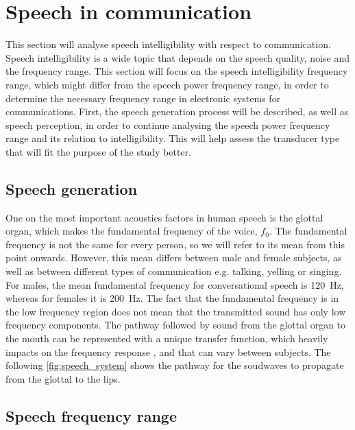 \section{Speech in communication}
\label{speech_in_comm}

This section will analyse speech intelligibility with respect to communication. Speech intelligibility is a wide topic that depends on the speech quality, noise and the frequency range. This section will focus on the speech intelligibility frequency range, which might differ from the speech power frequency range, in order to determine the necessary frequency range in electronic systems for communications. First, the speech generation process will be described, as well as speech perception, in order to continue analysing the speech power frequency range and its relation to intelligibility. This will help assess the transducer type that will fit the purpose of the study better.

\subsection{Speech generation}

One on the most important acoustics factors in human speech is the glottal organ, which makes the fundamental frequency of the voice, $f_0$. The fundamental frequency is not the same for every person, so we will refer to its mean from this point onwards. However, this mean differs between male and female subjects, as well as between different types of communication e.g. talking, yelling or singing. For males, the mean fundamental frequency for conversational speech is \SI{120}{\hertz}, whereas for females it is \SI{200}{\hertz}. The fact that the fundamental frequency is in the low frequency region does not mean that the transmitted sound has only low frequency components. 
The pathway followed by sound from the glottal organ to the mouth can be represented with a unique transfer function, which heavily impacts on the frequency response \citep{pulkki2015}, and that can vary between subjects. The following \autoref{fig:speech_system} shows the pathway for the soudwaves to propagate from the glottal to the lips.



\subsection{Speech frequency range}


